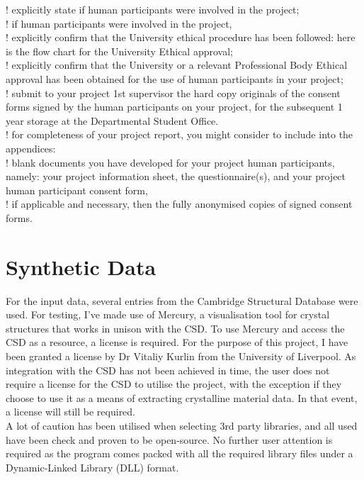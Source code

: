 ! explicitly state if human participants were involved in the project; \\
! if human participants were involved in the project, \\
! explicitly confirm that the University ethical procedure has been
followed: here is the flow chart for the University Ethical
approval; \\
! explicitly confirm that the University or a relevant Professional
Body Ethical approval has been obtained for the use of human
participants in your project; \\
! submit to your project 1st supervisor the hard copy originals of
the consent forms signed by the human participants on your
project, for the subsequent 1 year storage at the Departmental
Student Office. \\
! for completeness of your project report, you might consider to
include into the appendices: \\
! blank documents you have developed for your project
human participants, namely: your project information
sheet, the questionnaire(s), and your project human
participant consent form, \\
! if applicable and necessary, then the
fully anonymised copies of signed consent forms. \\

\section{Synthetic Data}

For the input data, several entries from the Cambridge Structural Database
were used. For testing, I’ve made use of Mercury, a visualisation tool for
crystal structures that works in unison with the CSD. To use Mercury and
access the CSD as a resource, a license is required. For the purpose of this
project, I have been granted a license by Dr Vitaliy Kurlin from the University
of Liverpool. As integration with the CSD has not been achieved in time, the
user does not require a license for the CSD to utilise the project, with the
exception if they choose to use it as a means of extracting crystalline material
data. In that event, a license will still be required. \\
A lot of caution has been utilised when selecting 3rd party libraries, and
all used have been check and proven to be open-source. No further user
attention is required as the program comes packed with all the required
library files under a Dynamic-Linked Library (DLL) format. \\